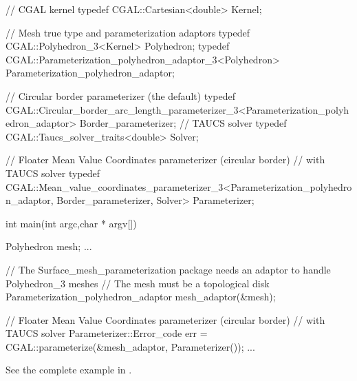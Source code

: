 \begin{ccExampleCode}

// CGAL kernel
typedef CGAL::Cartesian<double>                         Kernel;

// Mesh true type and parameterization adaptors
typedef CGAL::Polyhedron_3<Kernel>                      Polyhedron;
typedef CGAL::Parameterization_polyhedron_adaptor_3<Polyhedron>
                                                        Parameterization_polyhedron_adaptor;

// Circular border parameterizer (the default)
typedef CGAL::Circular_border_arc_length_parameterizer_3<Parameterization_polyhedron_adaptor>
                                                        Border_parameterizer;
// TAUCS solver
typedef CGAL::Taucs_solver_traits<double>               Solver;

// Floater Mean Value Coordinates parameterizer (circular border)
// with TAUCS solver
typedef CGAL::Mean_value_coordinates_parameterizer_3<Parameterization_polyhedron_adaptor,
                                                   Border_parameterizer,
                                                   Solver>
                                                        Parameterizer;

int main(int argc,char * argv[])
{
    Polyhedron mesh;
    ...

    // The Surface_mesh_parameterization package needs an adaptor to handle Polyhedron_3 meshes
    // The mesh must be a topological disk
    Parameterization_polyhedron_adaptor mesh_adaptor(&mesh);

    // Floater Mean Value Coordinates parameterizer (circular border)
    // with TAUCS solver
    Parameterizer::Error_code err = CGAL::parameterize(&mesh_adaptor, Parameterizer());
    ...
}

\end{ccExampleCode}

See the complete example in .

